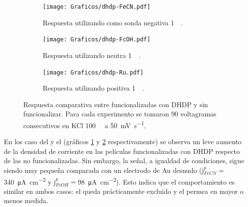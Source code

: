 		    	\begin{figure}[h!]	
					\begin{subfigure}[t]{0.495\textwidth}
			 	    \texttt{[image: Graficos/dhdp-FeCN.pdf]}
			        \caption{Respuesta utilizando como sonda negativa \ferroferri\space \SI{1}{\milli\Molar}.}
			        \label{fig:dhdp-vc-fe}
			        \end{subfigure}
			         \begin{subfigure}[t]{0.495\textwidth}
			 	    \texttt{[image: Graficos/dhdp-FcOH.pdf]}
			        \caption{Respuesta utilizando neutra \fc\space \SI{1}{\milli\Molar}.}
			        \label{fig:dhdp-vc-fc}
			        \end{subfigure}
			        \begin{center}
			        \begin{subfigure}[t]{0.60\textwidth}
			 	    \texttt{[image: Graficos/dhdp-Ru.pdf]}
			        \caption{Respuesta utilizando positiva \aminorutenio\space \SI{1}{\milli\Molar}.}
			        \label{fig:dhdp-vc-ru}
			        \end{subfigure}
			        \end{center}
			        \caption[Voltagramas de \pdmZ$^P_3$ con \aminorutenio, \fc\space y \ferroferri]{Respuesta comparativa entre \pdmZ\space funcionalizadas con DHDP y sin funcionalizar. Para cada experimento se tomaron 90 voltagramas consecutivos en KCl \SI{100}{\milli\Molar} a \SI{50}{\milli\volt\per\second}.}
			        \label{fig:dhdp-vc}
			      	\end{figure}

		    En los caso del \fe\space y el \fc\space (gráficos \ref{fig:dhdp-vc-fe} y \ref{fig:dhdp-vc-fc} respectivamente) se observa un leve aumento de la densidad de corriente en las películas funcionalizadas con DHDP respecto de las no funcionalizadas. Sin embargo, la señal, a igualdad de condiciones, sigue siendo muy pequeña comparada con un electrodo de Au  desnudo (j$^p_{FeCN}\!=$\SI{340}{\micro\ampere\per\square\cm} y j$^p_{FcOH}\!=$\SI{98}{\micro\ampere\per\square\cm}). Esto indica que el comportamiento es similar en ambos casos: el \fe\space queda prácticamente excluido y el \fc\space permea en mayor o menos medida.

